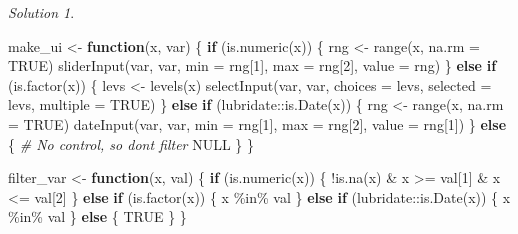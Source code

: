 \documentclass[
]{book}
\newenvironment{Shaded}{\begin{snugshade}}{\end{snugshade}}
\newcommand{\AttributeTok}[1]{\textcolor[rgb]{0.77,0.63,0.00}{#1}}
\newcommand{\CommentTok}[1]{\textcolor[rgb]{0.56,0.35,0.01}{\textit{#1}}}
\newcommand{\ConstantTok}[1]{\textcolor[rgb]{0.00,0.00,0.00}{#1}}
\newcommand{\ControlFlowTok}[1]{\textcolor[rgb]{0.13,0.29,0.53}{\textbf{#1}}}
\newcommand{\DecValTok}[1]{\textcolor[rgb]{0.00,0.00,0.81}{#1}}
\newcommand{\FunctionTok}[1]{\textcolor[rgb]{0.00,0.00,0.00}{#1}}
\newcommand{\NormalTok}[1]{#1}
\newcommand{\OtherTok}[1]{\textcolor[rgb]{0.56,0.35,0.01}{#1}}
\newcommand{\SpecialCharTok}[1]{\textcolor[rgb]{0.00,0.00,0.00}{#1}}
\theoremstyle{definition}
\theoremstyle{definition}
\theoremstyle{definition}
\theoremstyle{definition}
\theoremstyle{remark}
\newtheorem*{solution}{Solution}
\begin{document}
\begin{solution}
\begin{Shaded}
\begin{Highlighting}[]
\NormalTok{make\_ui }\OtherTok{\textless{}{-}} \ControlFlowTok{function}\NormalTok{(x, var) \{}
  \ControlFlowTok{if}\NormalTok{ (}\FunctionTok{is.numeric}\NormalTok{(x)) \{}
\NormalTok{    rng }\OtherTok{\textless{}{-}} \FunctionTok{range}\NormalTok{(x, }\AttributeTok{na.rm =} \ConstantTok{TRUE}\NormalTok{)}
    \FunctionTok{sliderInput}\NormalTok{(var, var, }\AttributeTok{min =}\NormalTok{ rng[}\DecValTok{1}\NormalTok{], }\AttributeTok{max =}\NormalTok{ rng[}\DecValTok{2}\NormalTok{], }\AttributeTok{value =}\NormalTok{ rng)}
\NormalTok{  \} }\ControlFlowTok{else} \ControlFlowTok{if}\NormalTok{ (}\FunctionTok{is.factor}\NormalTok{(x)) \{}
\NormalTok{    levs }\OtherTok{\textless{}{-}} \FunctionTok{levels}\NormalTok{(x)}
    \FunctionTok{selectInput}\NormalTok{(var, var, }\AttributeTok{choices =}\NormalTok{ levs, }\AttributeTok{selected =}\NormalTok{ levs, }\AttributeTok{multiple =} \ConstantTok{TRUE}\NormalTok{)}
\NormalTok{  \} }\ControlFlowTok{else} \ControlFlowTok{if}\NormalTok{ (lubridate}\SpecialCharTok{::}\FunctionTok{is.Date}\NormalTok{(x)) \{}
\NormalTok{    rng }\OtherTok{\textless{}{-}} \FunctionTok{range}\NormalTok{(x, }\AttributeTok{na.rm =} \ConstantTok{TRUE}\NormalTok{)}
    \FunctionTok{dateInput}\NormalTok{(var, var, }\AttributeTok{min =}\NormalTok{ rng[}\DecValTok{1}\NormalTok{], }\AttributeTok{max =}\NormalTok{ rng[}\DecValTok{2}\NormalTok{], }\AttributeTok{value =}\NormalTok{ rng[}\DecValTok{1}\NormalTok{])}
\NormalTok{  \} }\ControlFlowTok{else}\NormalTok{ \{}
    \CommentTok{\# No control, so don\textquotesingle{}t filter}
    \ConstantTok{NULL}
\NormalTok{  \}}
\NormalTok{\}}


\NormalTok{filter\_var }\OtherTok{\textless{}{-}} \ControlFlowTok{function}\NormalTok{(x, val) \{}
  \ControlFlowTok{if}\NormalTok{ (}\FunctionTok{is.numeric}\NormalTok{(x)) \{}
    \SpecialCharTok{!}\FunctionTok{is.na}\NormalTok{(x) }\SpecialCharTok{\&}\NormalTok{ x }\SpecialCharTok{\textgreater{}=}\NormalTok{ val[}\DecValTok{1}\NormalTok{] }\SpecialCharTok{\&}\NormalTok{ x }\SpecialCharTok{\textless{}=}\NormalTok{ val[}\DecValTok{2}\NormalTok{]}
\NormalTok{  \} }\ControlFlowTok{else} \ControlFlowTok{if}\NormalTok{ (}\FunctionTok{is.factor}\NormalTok{(x)) \{}
\NormalTok{    x }\SpecialCharTok{\%in\%}\NormalTok{ val}
\NormalTok{  \} }\ControlFlowTok{else} \ControlFlowTok{if}\NormalTok{ (lubridate}\SpecialCharTok{::}\FunctionTok{is.Date}\NormalTok{(x)) \{}
\NormalTok{    x }\SpecialCharTok{\%in\%}\NormalTok{ val}
\NormalTok{  \} }\ControlFlowTok{else}\NormalTok{ \{}
    \ConstantTok{TRUE}
\NormalTok{  \}}
\NormalTok{\}}


\end{Highlighting}
\end{Shaded}
\end{solution}
\end{document}
